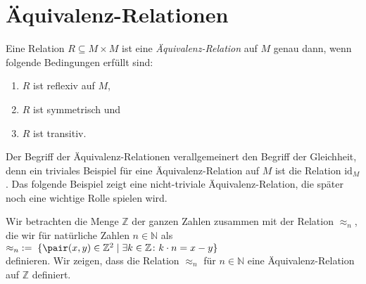 \section{\"{A}quivalenz-Relationen \label{section:aequivalenz_relation}}
\begin{Definition}
Eine Relation $R \subseteq M \times M$  ist eine 
\emph{\"{A}quivalenz-Relation} auf $M$ genau dann, wenn folgende Bedingungen erf\"{u}llt sind:
\begin{enumerate}
\item $R$ ist reflexiv auf $M$,
\item $R$ ist symmetrisch und
\item $R$ ist transitiv. \eox
\end{enumerate}
\end{Definition}

Der Begriff der \"{A}quivalenz-Relationen verallgemeinert den Begriff der Gleichheit, denn
ein triviales Beispiel f\"{u}r eine \"{A}quivalenz-Relation auf $M$ ist die Relation $\mathrm{id}_M$.
Das folgende Beispiel zeigt eine nicht-triviale \"{A}quivalenz-Relation, die sp\"{a}ter noch eine wichtige
Rolle spielen wird.

\example
Wir betrachten die Menge $\mathbb{Z}$ der ganzen Zahlen
zusammen mit der Relation $\approx_n$, die wir f\"{u}r nat\"{u}rliche Zahlen $n\in\mathbb{N}$ 
als \\[0.2cm]
\hspace*{1.3cm}
 $\approx_n \;:=\; \{ \pair(x,y) \in \mathbb{Z}^2 \mid \exists k \in \mathbb{Z} \colon k \cdot n = x - y \}$
\\[0.2cm]
definieren.  Wir zeigen, dass die Relation $\approx_n$ f\"{u}r $n \in \mathbb{N}$ eine \"{A}quivalenz-Relation auf
$\mathbb{Z}$ definiert. 

